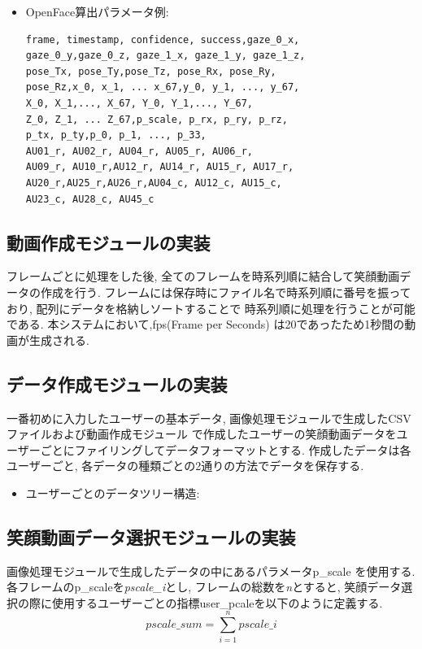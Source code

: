 \begin{itemize}
\item OpenFace算出パラメータ例:
\begin{lstlisting}
frame, timestamp, confidence, success,gaze_0_x,
gaze_0_y,gaze_0_z, gaze_1_x, gaze_1_y, gaze_1_z,
pose_Tx, pose_Ty,pose_Tz, pose_Rx, pose_Ry,
pose_Rz,x_0, x_1, ... x_67,y_0, y_1, ..., y_67,
X_0, X_1,..., X_67, Y_0, Y_1,..., Y_67,
Z_0, Z_1, ... Z_67,p_scale, p_rx, p_ry, p_rz,
p_tx, p_ty,p_0, p_1, ..., p_33,
AU01_r, AU02_r, AU04_r, AU05_r, AU06_r,
AU09_r, AU10_r,AU12_r, AU14_r, AU15_r, AU17_r,
AU20_r,AU25_r,AU26_r,AU04_c, AU12_c, AU15_c,
AU23_c, AU28_c, AU45_c
\end{lstlisting}
\end{itemize}

\subsection{動画作成モジュールの実装}
フレームごとに処理をした後, 全てのフレームを時系列順に結合して笑顔動画データの作成を行う.
フレームには保存時にファイル名で時系列順に番号を振っており, 配列にデータを格納しソートすることで
時系列順に処理を行うことが可能である.
本システムにおいて,fps(Frame per Seconds) は20であったため1秒間の動画が生成される.

\subsection{データ作成モジュールの実装}
一番初めに入力したユーザーの基本データ, 画像処理モジュールで生成したCSVファイルおよび動画作成モジュール
で作成したユーザーの笑顔動画データをユーザーごとにファイリングしてデータフォーマットとする.
作成したデータは各ユーザーごと, 各データの種類ごとの2通りの方法でデータを保存する.

\begin{itemize}
\item ユーザーごとのデータツリー構造:
\end{itemize}

\subsection{笑顔動画データ選択モジュールの実装}
画像処理モジュールで生成したデータの中にあるパラメータp\_scale を使用する.
各フレームのp\_scaleを{\sl pscale\_i}とし, フレームの総数を{\sl n}とすると,
笑顔データ選択の際に使用するユーザーごとの指標user\_pcaleを以下のように定義する.
\begin{equation}
\label{pscalesum}
pscale\_sum = \sum_{i=1}^ n pscale\_i
\end{equation}


